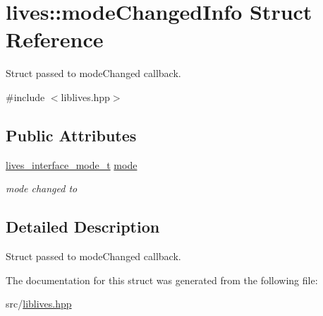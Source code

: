 \hypertarget{structlives_1_1modeChangedInfo}{\section{lives\-:\-:mode\-Changed\-Info Struct Reference}
\label{structlives_1_1modeChangedInfo}
}


Struct passed to mode\-Changed callback.  




{\ttfamily \#include $<$liblives.\-hpp$>$}

\subsection*{Public Attributes}
\begin{DoxyCompactItemize}
\item 
\hypertarget{structlives_1_1modeChangedInfo_abc4dd856262f42b9c121c53d2895d6a8}{\hyperlink{liblives_8hpp_a3033beb0f401e14cbff66f72a4168d1f}{lives\-\_\-interface\-\_\-mode\-\_\-t} \hyperlink{structlives_1_1modeChangedInfo_abc4dd856262f42b9c121c53d2895d6a8}{mode}}\label{structlives_1_1modeChangedInfo_abc4dd856262f42b9c121c53d2895d6a8}

\begin{DoxyCompactList}\small\item\em mode changed to \end{DoxyCompactList}\end{DoxyCompactItemize}


\subsection{Detailed Description}
Struct passed to mode\-Changed callback. 

The documentation for this struct was generated from the following file\-:\begin{DoxyCompactItemize}
\item 
src/\hyperlink{liblives_8hpp}{liblives.\-hpp}\end{DoxyCompactItemize}

